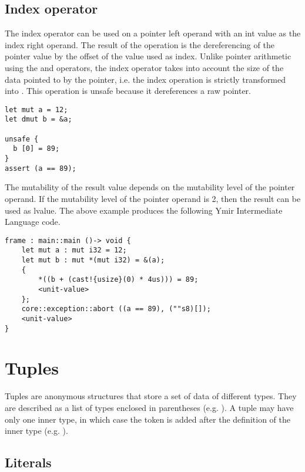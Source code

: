 \subsection {Index operator}

The index operator can be used on a pointer left operand with an int value as
the index right operand. The result of the operation is the dereferencing of the
pointer value by the offset of the value used as index. Unlike pointer
arithmetic using the \token{+} and \token{-} operators, the index operator
takes into account the size of the data pointed to by the pointer, i.e. the
index operation  is strictly transformed into . This operation is unsafe
because it dereferences a raw pointer.

\smallskip

\begin{lstlisting}[style=coloredverbatim]
let mut a = 12;
let dmut b = &a;

unsafe {
  b [0] = 89;
}
assert (a == 89);
\end{lstlisting}

\smallskip

The mutability of the result value depends on the mutability level of the
pointer operand. If the mutability level of the pointer operand is 2, then the
result can be used as lvalue. The above example produces the following Ymir Intermediate Language code.

\begin{lstlisting}[style=intermediateVerb]
frame : main::main ()-> void {
    let mut a : mut i32 = 12;
    let mut b : mut *(mut i32) = &(a);
    {
        *((b + (cast!{usize}(0) * 4us))) = 89;
        <unit-value>
    };
    core::exception::abort ((a == 89), (""s8)[]);
    <unit-value>
}
\end{lstlisting}

\section {Tuples}


Tuples are anonymous structures that store a set of data of different types.
They are described as a list of types enclosed in parentheses (e.g.
). A tuple may have only one inner type, in which case
the token \token{,} is added after the definition of the inner type (e.g.
).

\subsection {Literals}

